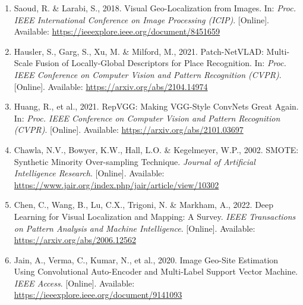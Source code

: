 \begin{enumerate}
\item Saoud, R. \& Larabi, S., 2018. Visual Geo-Localization from Images. In: \textit{Proc. IEEE International Conference on Image Processing (ICIP)}. [Online]. Available: \url{https://ieeexplore.ieee.org/document/8451659}

\item Hausler, S., Garg, S., Xu, M. \& Milford, M., 2021. Patch-NetVLAD: Multi-Scale Fusion of Locally-Global Descriptors for Place Recognition. In: \textit{Proc. IEEE Conference on Computer Vision and Pattern Recognition (CVPR)}. [Online]. Available: \url{https://arxiv.org/abs/2104.14974}

\item Huang, R., et al., 2021. RepVGG: Making VGG-Style ConvNets Great Again. In: \textit{Proc. IEEE Conference on Computer Vision and Pattern Recognition (CVPR)}. [Online]. Available: \url{https://arxiv.org/abs/2101.03697}

\item Chawla, N.V., Bowyer, K.W., Hall, L.O. \& Kegelmeyer, W.P., 2002. SMOTE: Synthetic Minority Over-sampling Technique. \textit{Journal of Artificial Intelligence Research}. [Online]. Available: \url{https://www.jair.org/index.php/jair/article/view/10302}

\item Chen, C., Wang, B., Lu, C.X., Trigoni, N. \& Markham, A., 2022. Deep Learning for Visual Localization and Mapping: A Survey. \textit{IEEE Transactions on Pattern Analysis and Machine Intelligence}. [Online]. Available: \url{https://arxiv.org/abs/2006.12562}

\item Jain, A., Verma, C., Kumar, N., et al., 2020. Image Geo-Site Estimation Using Convolutional Auto-Encoder and Multi-Label Support Vector Machine. \textit{IEEE Access}. [Online]. Available: \url{https://ieeexplore.ieee.org/document/9141093}
\end{enumerate}
